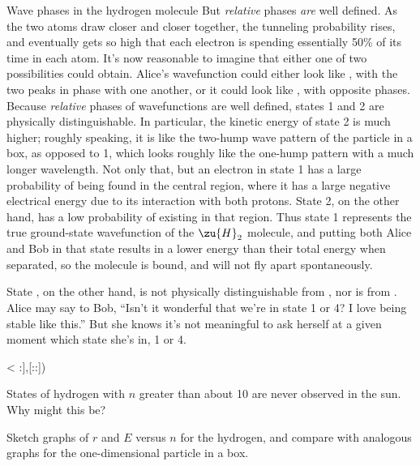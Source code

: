 \begin{eg}{Wave phases in the hydrogen molecule}
But \emph{relative} phases \emph{are} well defined. As the two atoms draw closer and closer together,
the tunneling probability rises, and eventually gets so high that each electron is spending essentially
50\% of its time in each atom. It's now reasonable to imagine that either one of two possibilities could
obtain. Alice's wavefunction could either look like , with the two peaks in
phase with one another, or it could look like , with opposite phases. Because
\emph{relative} phases of wavefunctions are well defined, states 1 and 2 are physically distinguishable.
In particular, the kinetic energy of state 2 is much higher; roughly speaking, it is like the two-hump
wave pattern of the particle in a box, as opposed to 1, which looks roughly like the one-hump pattern
with a much longer wavelength. Not only that, but an electron in state 1 has a large probability of being found in the
central region, where it has a large negative electrical energy due to its interaction with both protons.
State 2, on the other hand, has a low probability of existing in that region. Thus state 1 represents the
true ground-state wavefunction of the $\zu{H}_2$ molecule, and putting both Alice and Bob in that state
results in a lower energy than their total energy when separated, so the molecule is bound, and will not
fly apart spontaneously.

State , on the other hand, is not physically distinguishable from ,
nor is  from . Alice may say to Bob, ``Isn't it wonderful that
we're in state 1 or 4? I love being stable like this.'' But she knows it's not meaningful to ask herself
at a given moment which state she's in, 1 or 4.
\end{eg}


<%
:],[::])

\startdqs

\begin{dq}
States of hydrogen with $n$ greater than about 10 are
never observed in the sun. Why might this be?
\end{dq}

\begin{dq}
Sketch graphs of $r$ and $E$ versus $n$ for the hydrogen,
and compare with analogous graphs for the one-dimensional particle in a box.
\end{dq}
